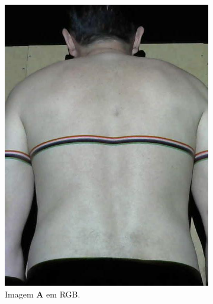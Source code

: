 \documentclass[12pt]{article}
\begin{document}
\begin{figure}[!h]
     \centering
     \begin{subfigure}[b]{0.4\textwidth}
         \centering
         \includegraphics[width=\textwidth]{11_obj_color.jpg}
         \caption{Imagem $\mathbf{A}$ em RGB.}
         \label{fig:cordetect:rgb}
     \end{subfigure}
     \hfill
     \begin{subfigure}[b]{0.4\textwidth}
         \centering

\end{subfigure}
\end{figure}
\end{document}
